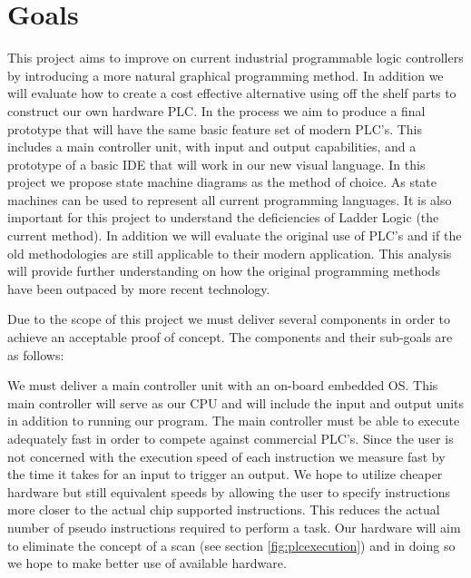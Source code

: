 \section{Goals}

This project aims to improve on current industrial programmable logic controllers by introducing a more natural graphical programming method. In addition we will evaluate how to create a cost effective alternative using off the shelf parts to construct our own hardware PLC. In the process we aim to produce a final prototype that will have the same basic feature set of modern PLC's. This includes a main controller unit, with input and output capabilities, and a prototype of a basic IDE that will work in our new visual language. In this project we propose state machine diagrams as the method of choice. As state machines can be used to represent all current programming languages. It is also important for this project to understand the deficiencies of Ladder Logic (the current method). In addition we will evaluate the original use of PLC's and if the old methodologies are still applicable to their modern application. This analysis will provide further understanding on how the original programming methods have been outpaced by more recent technology.

Due to the scope of this project we must deliver several components in order to achieve an acceptable proof of concept. The components and their sub-goals are as follows:

We must deliver a main controller unit with an on-board embedded OS. This main controller will serve as our CPU and will include the input and output units in addition to running our program. The main controller must be able to execute adequately fast in order to compete against commercial PLC's. Since the user is not concerned with the execution speed of each instruction we measure fast by the time it takes for an input to trigger an output. We hope to utilize cheaper hardware but still equivalent speeds by allowing the user to specify instructions more closer to the actual chip supported instructions. This reduces the actual number of pseudo instructions required to perform a task. Our hardware will aim to eliminate the concept of a scan (see section \ref{fig:plcexecution}) and in doing so we hope to make better use of available hardware.

